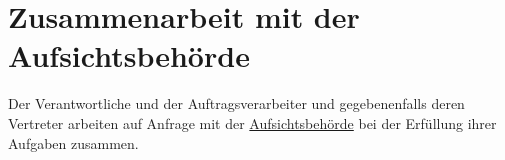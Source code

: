 \chapter{Zusammenarbeit mit der Aufsichtsbehörde}
\label{ch:31}


Der Verantwortliche und der Auftragsverarbeiter und gegebenenfalls deren Vertreter arbeiten auf Anfrage mit der
\hyperref[itm:04-21]{Aufsichtsbehörde} bei der Erfüllung ihrer Aufgaben zusammen.


